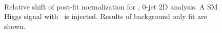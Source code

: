 \begin{figure}[!hbtp]
{}
\\
\caption{Relative shift of post-fit normalization for  \GeV, 0-jet 2D analysis.
A SM Higgs signal with  \GeV\ is injected. Results of background only fit are shown.}
\label{fig:norm_inj200_0j_125_bfit}
\end{figure}

